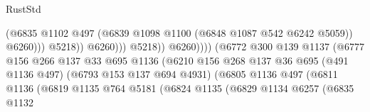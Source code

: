 \begin{lexlean}{RustStd}
\begin{coremodule}
                                                              (@6835
                                                                @1102
                                                                @497
                                                                (@6839
                                                                  @1098
                                                                  @1100
                                                                  (@6848 @1087 @542 @6242 @5059))
                                                                @6260)))
                                                          @5218))
                                                      @6260)))
                                                @5218))
                                            @6260))))
                                    (@6772
                                      @300
                                      @139
                                      @1137
                                      (@6777
                                        @156
                                        @266
                                        @137
                                        @33
                                        @695
                                        @1136
                                        (@6210
                                          @156
                                          @268
                                          @137
                                          @36
                                          @695
                                          (@491 @1136 @497)
                                          (@6793 @153 @137 @694 @4931)
                                          (@6805
                                            @1136
                                            @497
                                            (@6811
                                              @1136
                                              (@6819
                                                @1135
                                                @764
                                                @5181
                                                (@6824
                                                  @1135
                                                  (@6829
                                                    @1134
                                                    @6257
                                                    (@6835
                                                      @1132

\end{coremodule}
\end{lexlean}

